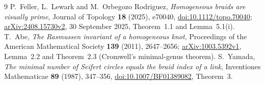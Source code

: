 \documentclass[11pt]{article}
\begin{document}
\begin{thebibliography}{9}
P.~Feller, L.~Lewark and M.~Orbegozo Rodriguez,
\emph{Homogeneous braids are visually prime},
Journal of Topology \textbf{18} (2025), e70040,
\href{https://doi.org/10.1112/topo.70040}{doi:10.1112/topo.70040};
\href{https://arxiv.org/abs/2408.15730}{arXiv:2408.15730v2},
30 September 2025, Theorem~1.1 and Lemma~5.1(i).
T.~Abe, \emph{The Rasmussen invariant of a homogeneous knot},
Proceedings of the American Mathematical Society \textbf{139} (2011),
2647--2656; \href{https://arxiv.org/abs/1003.5392}{arXiv:1003.5392v1},
Lemma~2.2 and Theorem~2.3 (Cromwell's minimal-genus theorem).
S.~Yamada, \emph{The minimal number of Seifert circles equals the braid
index of a link}, Inventiones Mathematicae \textbf{89} (1987), 347--356,
\href{https://doi.org/10.1007/BF01389082}{doi:10.1007/BF01389082},
Theorem~3.
\end{thebibliography}
\end{document}
